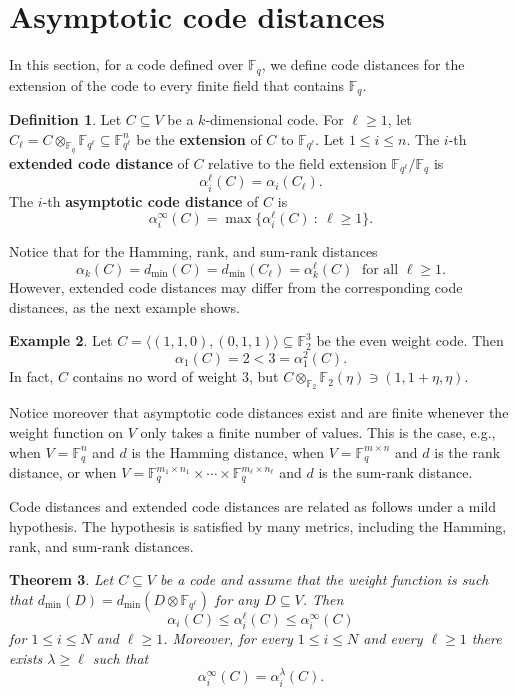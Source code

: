 \documentclass[12pt]{amsart}
\numberwithin{equation}{section}
\newtheorem{theorem}{Theorem}[section]
\theoremstyle{definition}
\newtheorem{definition}[theorem]{Definition}
\newtheorem{example}[theorem]{Example}
\newcommand{\FF}{\mathbb{F}}
\begin{document}
\section{Asymptotic code distances}\label{asymtotic}

In this section, for a code defined over $\FF_q$, we define code distances for the extension of the code to every finite field that contains $\FF_q$. 

\begin{definition}
Let $C\subseteq V$ be a $k$-dimensional code. For $\ell\geq 1$, let $C_\ell=C\otimes_{\FF_q}\FF_{q^\ell}\subseteq\FF_{q^\ell}^n$ be the {\bf extension} of $C$ to $\FF_{q^\ell}$.
Let $1\leq i\leq n$. The $i$-th {\bf extended code distance} of $C$ relative to the field extension $\FF_{q^\ell}/\FF_q$ is 
$$\alpha_i^\ell(C)=\alpha_i(C_{\ell}).$$
The $i$-th {\bf asymptotic code distance} of $C$ is 
$$\alpha^\infty_i(C)=\max\{\alpha_i^\ell(C)\ : \ \ell\geq 1\}.$$
\end{definition}

Notice that for the Hamming, rank, and sum-rank distances $$\alpha_k(C)=d_{\min}(C)=d_{\min}(C_\ell)=\alpha_k^\ell(C)\; \mbox{ for all } \ell\geq 1.$$
However, extended code distances may differ from the corresponding code distances, as the next example shows.

\begin{example}
Let $C=\langle(1,1,0),(0,1,1)\rangle\subseteq\FF_2^3$ be the even weight code. Then $$\alpha_1(C)=2<3=\alpha_1^2(C).$$ In fact, $C$ contains no word of weight $3$, but $C\otimes_{\FF_2}\FF_2(\eta)\ni (1,1+\eta,\eta)$.
\end{example}

Notice moreover that asymptotic code distances exist and are finite whenever the weight function on $V$ only takes a finite number of values. This is the case, e.g., when $V=\FF_q^n$ and $d$ is the Hamming distance, when $V=\FF_q^{m\times n}$ and $d$ is the rank distance, or when $V=\FF_q^{m_1\times n_1}\times\cdots\times\FF_q^{m_\ell\times n_\ell}$ and $d$ is the sum-rank distance.

\medskip 

Code distances and extended code distances are related as follows under a mild hypothesis. The hypothesis is satisfied by many metrics, including the Hamming, rank, and sum-rank distances.

\begin{theorem}
Let $C\subseteq V$ be a code and assume that the weight function is such that $d_{\min}(D)=d_{\min}(D\otimes\mathbb{F}_{q^\ell})$ for any $D\subseteq V$. Then 
$$\alpha_i(C)\leq \alpha_i^{\ell}(C)\leq \alpha^\infty_i(C)$$
for $1\leq i\leq N$ and $\ell\geq 1$.  
Moreover, for every $1\leq i\leq N$ and every $\ell\geq 1$ there exists $\lambda\geq \ell$ such that
$$\alpha^\infty_i(C)=\alpha_i^{\lambda}(C).$$
\end{theorem}
\end{document}
